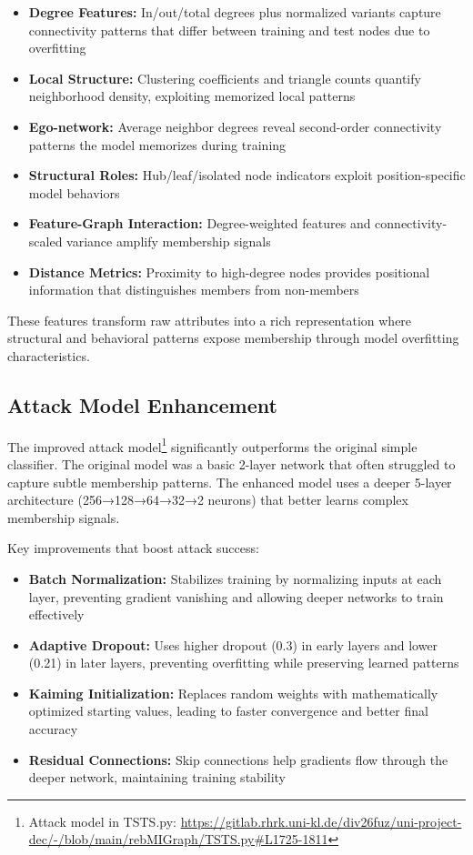 \documentclass{article}
\begin{document}
\begin{itemize}
\item \textbf{Degree Features:} In/out/total degrees plus normalized variants capture connectivity patterns that differ between training and test nodes due to overfitting
\item \textbf{Local Structure:} Clustering coefficients and triangle counts quantify neighborhood density, exploiting memorized local patterns
\item \textbf{Ego-network:} Average neighbor degrees reveal second-order connectivity patterns the model memorizes during training
\item \textbf{Structural Roles:} Hub/leaf/isolated node indicators exploit position-specific model behaviors
\item \textbf{Feature-Graph Interaction:} Degree-weighted features and connectivity-scaled variance amplify membership signals
\item \textbf{Distance Metrics:} Proximity to high-degree nodes provides positional information that distinguishes members from non-members
\end{itemize}

These features transform raw attributes into a rich representation where structural and behavioral patterns expose membership through model overfitting characteristics.

\subsection{Attack Model Enhancement}
The improved attack model\footnote{Attack model in TSTS.py: \url{https://gitlab.rhrk.uni-kl.de/div26fuz/uni-project-dec/-/blob/main/rebMIGraph/TSTS.py\#L1725-1811}} significantly outperforms the original simple classifier. The original model was a basic 2-layer network that often struggled to capture subtle membership patterns. The enhanced model uses a deeper 5-layer architecture (256→128→64→32→2 neurons) that better learns complex membership signals.

Key improvements that boost attack success:
\begin{itemize}
\item \textbf{Batch Normalization:} Stabilizes training by normalizing inputs at each layer, preventing gradient vanishing and allowing deeper networks to train effectively
\item \textbf{Adaptive Dropout:} Uses higher dropout (0.3) in early layers and lower (0.21) in later layers, preventing overfitting while preserving learned patterns
\item \textbf{Kaiming Initialization:} Replaces random weights with mathematically optimized starting values, leading to faster convergence and better final accuracy
\item \textbf{Residual Connections:} Skip connections help gradients flow through the deeper network, maintaining training stability
\end{itemize}
\end{document}

